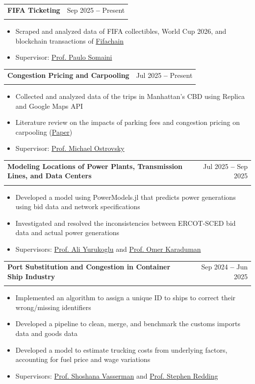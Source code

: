 \documentclass[letterpaper,11pt]{article}
\makeatletter
\newcommand{\resumeItem}[1]{
  \item\small{
    {#1 \vspace{-2pt}}
  }
}
\newcommand{\resumeSubheading}[4]{
  \vspace{-2pt}\item
    \begin{tabular*}{0.97\textwidth}[t]{l@{\extracolsep{\fill}}r}
      \textbf{#1} & #2 \\
      \textit{\small#3} & \textit{\small #4} \\
    \end{tabular*}\vspace{-7pt}
}
\newcommand{\resumeItemListStart}{\begin{itemize}}
\newcommand{\resumeItemListEnd}{\end{itemize}\vspace{-5pt}}
\makeatother
\begin{document}
    \resumeSubheading
    {FIFA Ticketing
    }{\normalfont Sep 2025 \textbf{--} Present}{}{}\vspace{-4mm}
    \resumeItemListStart
        \resumeItem{Scraped and analyzed data of FIFA collectibles, World Cup 2026, and blockchain transactions of \href{https://explorer.fifachain.io/}{\textcolor{myblue}{Fifachain}}}
        \resumeItem{Supervisor: \href{https://gsb-faculty.stanford.edu/paulo-somaini/}{\textcolor{myblue}{Prof. Paulo Somaini}}}
    \resumeItemListEnd

    \resumeSubheading
    {Congestion Pricing and Carpooling
    }{\normalfont Jul 2025 \textbf{--} Present}{}{}\vspace{-4mm}
    \resumeItemListStart
        \resumeItem{Collected and analyzed data of the trips in Manhattan's CBD using Replica and Google Maps API}
        \resumeItem{Literature review on the impacts of parking fees and congestion pricing on carpooling (\href{https://www.nber.org/papers/w34261}{\textcolor{myblue}{Paper}})}
        \resumeItem{Supervisor: \href{https://web.stanford.edu/~ost/}{\textcolor{myblue}{Prof. Michael Ostrovsky}}}
    \resumeItemListEnd

    \resumeSubheading
    {Modeling Locations of Power Plants, Transmission Lines, and Data Centers}{\normalfont Jul 2025 \textbf{--} Sep 2025}{}{}\vspace{-4mm}
    \resumeItemListStart
        \resumeItem{Developed a model using PowerModels.jl that predicts power generations using bid data and network specifications}
        \resumeItem{Investigated and resolved the inconsistencies between ERCOT-SCED bid data and actual power generations}
        \resumeItem{Supervisors: \href{https://web.stanford.edu/~ayurukog/}{\textcolor{myblue}{Prof. Ali Yurukoglu}} and \href{https://gsb-faculty.stanford.edu/omer-karaduman/}{\textcolor{myblue}{Prof. Omer Karaduman}}}
    \resumeItemListEnd

    \resumeSubheading
    {Port Substitution and Congestion in Container Ship Industry}{\normalfont Sep 2024 \textbf{--} Jun 2025}{}{}\vspace{-4mm}
    \resumeItemListStart
        \resumeItem{Implemented an algorithm to assign a unique ID to ships to correct their wrong/missing identifiers}
        \resumeItem{Developed a pipeline to clean, merge, and benchmark the customs imports data and goods data}
        \resumeItem{Developed a model to estimate trucking costs from underlying factors, accounting for fuel price and wage variations}
        \resumeItem{Supervisors: \href{https://shoshanavasserman.com/}{\textcolor{myblue}{Prof. Shoshana Vasserman}} and \href{https://stephenredding.github.io/index.html}{\textcolor{myblue}{Prof. Stephen Redding}}}
    \resumeItemListEnd
\end{document}
